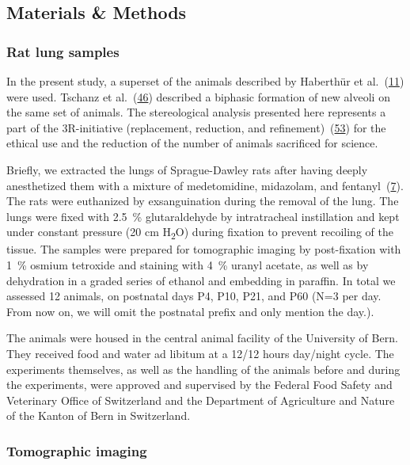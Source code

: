 \documentclass[
  american,
]{article}
\begin{document}
\hypertarget{materials-methods}{%
\subsection{Materials \& Methods}\label{materials-methods}}

\hypertarget{rat-lung-samples}{%
\subsubsection{Rat lung samples}\label{rat-lung-samples}}

In the present study, a superset of the animals described by Haberthür et al.~(\protect\hyperlink{ref-7YLeeyu}{11}) were used.
Tschanz et al.~(\protect\hyperlink{ref-wnl86DEM}{46}) described a biphasic formation of new alveoli on the same set of animals.
The stereological analysis presented here represents a part of the 3R-initiative (replacement, reduction, and refinement)~(\protect\hyperlink{ref-199ALtdJt}{53}) for the ethical use and the reduction of the number of animals sacrificed for science.

Briefly, we extracted the lungs of Sprague-Dawley rats after having deeply anesthetized them with a mixture of medetomidine, midazolam, and fentanyl~(\protect\hyperlink{ref-IdRLVLjl}{7}).
The rats were euthanized by exsanguination during the removal of the lung.
The lungs were fixed with 2.5~\% glutaraldehyde by intratracheal instillation and kept under constant pressure (20 cm H\textsubscript{2}O) during fixation to prevent recoiling of the tissue.
The samples were prepared for tomographic imaging by post-fixation with 1~\% osmium tetroxide and staining with 4~\% uranyl acetate, as well as by dehydration in a graded series of ethanol and embedding in paraffin.
In total we assessed 12 animals, on postnatal days P4, P10, P21, and P60 (N=3 per day.
From now on, we will omit the postnatal prefix and only mention the day.).

The animals were housed in the central animal facility of the University of Bern.
They received food and water ad libitum at a 12/12 hours day/night cycle.
The experiments themselves, as well as the handling of the animals before and during the experiments, were approved and supervised by the Federal Food Safety and Veterinary Office of Switzerland and the Department of Agriculture and Nature of the Kanton of Bern in Switzerland.

\hypertarget{tomographic-imaging}{%
\subsubsection{Tomographic imaging}\label{tomographic-imaging}}
\end{document}
